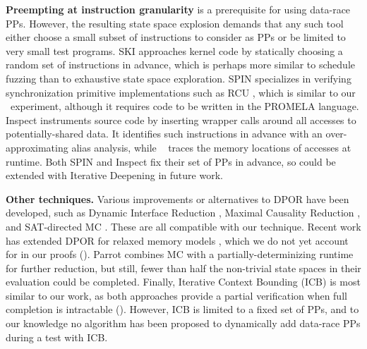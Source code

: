 {\bf Preempting at instruction granularity} is a prerequisite for using data-race PPs.
However, the resulting state space explosion demands that any such tool either
choose a small subset of instructions to consider as PPs
or be limited to very small test programs.
SKI \cite{ski} approaches kernel code by statically choosing a random set of instructions in advance, %
which is perhaps more similar to
schedule fuzzing \cite{randomized-scheduler} than to exhaustive state space exploration.
%
SPIN \cite{spin} specializes in verifying synchronization primitive implementations such as RCU \cite{rcu}, which is similar to our \mxtest~experiment,
although it requires code to be written in the PROMELA language.
%
Inspect \cite{inspect} instruments source code by inserting wrapper calls around all accesses to potentially-shared data.
It identifies such instructions in advance with an over-approximating alias analysis,
while \landslide~\cite{landslide} traces the memory locations of accesses at runtime.
Both SPIN and Inspect fix their set of PPs in advance, so could be
extended with Iterative Deepening in future work.

{\bf Other techniques.} Various improvements or alternatives to DPOR have been developed, such as Dynamic Interface Reduction \cite{demeter}, Maximal Causality Reduction \cite{mcr},
and SAT-directed MC \cite{satcheck}.
These are all compatible with our technique.
Recent work \cite{tsopso} has extended DPOR for relaxed memory models \cite{memory-consistency-models},
which we do not yet account for in our proofs (\sect{\ref{sec:soundness}}).
Parrot \cite{parrot} combines MC with a partially-determinizing runtime for further reduction, but still, fewer than half the non-trivial state spaces in their evaluation could be completed.
Finally, Iterative Context Bounding (ICB) \cite{chess-icb} is most similar to our work,
as both approaches provide a partial verification
when full completion is intractable (\sect{\ref{sec:future}}).
However, ICB is limited to a fixed set of PPs, and to our knowledge no algorithm has been proposed to dynamically add data-race PPs during a test with ICB.

